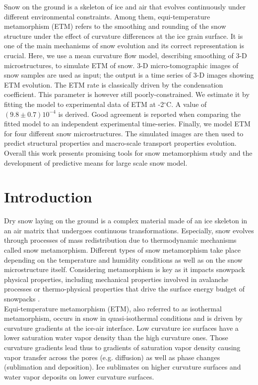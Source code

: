 \documentclass[draft,ms]{agujournal2019}
\begin{document}
Snow on the ground is a skeleton of ice and air that evolves continuously under different environmental constraints. Among them, equi-temperature metamorphism (ETM) refers to the smoothing and rounding of the snow structure under the effect of curvature differences at the ice grain surface. It is one of the main mechanisms of snow evolution and its correct representation is crucial. Here, we use a mean curvature flow model, describing smoothing of 3-D microstructures, to simulate ETM of snow. 3-D micro-tomographic images of snow samples are used as input; the output is a time series of 3-D images showing ETM evolution. The ETM rate is classically driven by the condensation coefficient. This parameter is however still poorly-constrained. We estimate it by fitting the model to experimental data of ETM at -2$^\circ$C. A value of $(9.8\pm0.7)10^{-4}$ is derived. Good agreement is reported when comparing the fitted model to an independent experimental time-series. Finally, we model ETM for four different snow microstructures. The simulated images are then used to predict structural properties and macro-scale transport properties evolution.
Overall this work presents promising tools for snow metamorphism study and the development of predictive means for large scale snow model. 

\section{Introduction}
\label{sec:intro}
Dry snow laying on the ground is a complex material made of an ice skeleton in an air matrix that undergoes continuous transformations. Especially, snow evolves through processes of mass redistribution due to thermodynamic mechanisms called snow metamorphism. Different types of snow metamorphism take place depending on the temperature and humidity conditions as well as on the snow microstructure itself. Considering metamorphism is key as it impacts snowpack physical properties, including mechanical properties involved in avalanche processes or thermo-physical properties that drive the surface energy budget of snowpacks \cite{lehning_physical_2002, vionnet_detailed_2012}.\\

Equi-temperature metamorphism (ETM), also referred to as isothermal metamorphism, occurs in snow in quasi-isothermal conditions and is driven by curvature gradients at the ice-air interface. Low curvature ice surfaces have a lower saturation water vapor density than the high curvature ones. Those curvature gradients lead thus to gradients of saturation vapor density causing vapor transfer across the pores (e.g. diffusion) as well as phase changes (sublimation and deposition). Ice sublimates on higher curvature surfaces and  water vapor deposits on lower curvature surfaces. 
\end{document}
